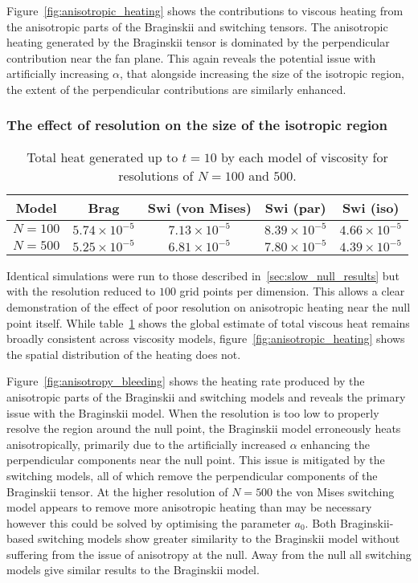 Figure~\ref{fig:anisotropic_heating} shows the contributions to viscous heating from the anisotropic parts of the Braginskii and switching tensors. The anisotropic heating generated by the Braginskii tensor is dominated by the perpendicular contribution near the fan plane. This again reveals the potential issue with artificially increasing $\alpha$, that alongside increasing the size of the isotropic region, the extent of the perpendicular contributions are similarly enhanced.

\subsubsection{The effect of resolution on the size of the isotropic region}

\begin{table}[t]
  \centering
  \caption{Total heat generated up to $t=10$ by each model of viscosity for resolutions of $N=100$ and $500$.}
  \label{tab:slow_null_results_resolution}
  \begin{tabular}{c|cccc}
Model &  Brag & Swi (von Mises) & Swi (par) & Swi (iso)\\
\midrule
$N=100$ &  $5.74 \times 10^{-5}$ & $7.13 \times 10^{-5}$ & $8.39 \times 10^{-5}$ & $4.66 \times 10^{-5}$\\
$N=500$   & $5.25 \times 10^{-5}$ & $6.81 \times 10^{-5}$ & $7.80 \times 10^{-5}$ & $4.39 \times 10^{-5}$  \end{tabular}
\end{table}

Identical simulations were run to those described in~\ref{sec:slow_null_results} but with the resolution reduced to $100$ grid points per dimension. This allows a clear demonstration of the effect of poor resolution on anisotropic heating near the null point itself. While table~\ref{tab:slow_null_results_resolution} shows the global estimate of total viscous heat remains broadly consistent across viscosity models, figure~\ref{fig:anisotropic_heating} shows the spatial distribution of the heating does not.

Figure~\ref{fig:anisotropy_bleeding} shows the heating rate produced by the anisotropic parts of the Braginskii and switching models and reveals the primary issue with the Braginskii model. When the resolution is too low to properly resolve the region around the null point, the Braginskii model erroneously heats anisotropically, primarily due to the artificially increased $\alpha$ enhancing the perpendicular components near the null point. This issue is mitigated by the switching models, all of which remove the perpendicular components of the Braginskii tensor. At the higher resolution of $N=500$ the von Mises switching model appears to remove more anisotropic heating than may be necessary however this could be solved by optimising the parameter $a_0$. Both Braginskii-based switching models show greater similarity to the Braginskii model without suffering from the issue of anisotropy at the null. Away from the null all switching models give similar results to the Braginskii model.

